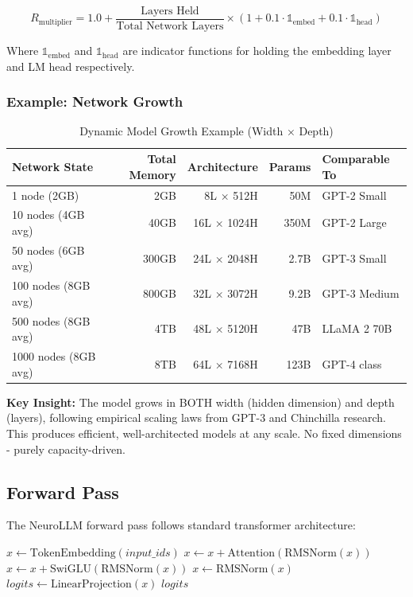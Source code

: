 \documentclass[11pt,a4paper]{article}
\begin{document}
\begin{equation}
R_{\text{multiplier}} = 1.0 + \frac{\text{Layers Held}}{\text{Total Network Layers}} \times (1 + 0.1 \cdot \mathbb{1}_{\text{embed}} + 0.1 \cdot \mathbb{1}_{\text{head}})
\end{equation}

Where $\mathbb{1}_{\text{embed}}$ and $\mathbb{1}_{\text{head}}$ are indicator functions for holding the embedding layer and LM head respectively.

\subsubsection{Example: Network Growth}

\begin{table}[H]
\centering
\caption{Dynamic Model Growth Example (Width × Depth)}
\label{tab:dynamic-growth}
\begin{tabular}{@{}lrrrl@{}}
\toprule
\textbf{Network State} & \textbf{Total Memory} & \textbf{Architecture} & \textbf{Params} & \textbf{Comparable To} \\
\midrule
1 node (2GB) & 2GB & 8L × 512H & 50M & GPT-2 Small \\
10 nodes (4GB avg) & 40GB & 16L × 1024H & 350M & GPT-2 Large \\
50 nodes (6GB avg) & 300GB & 24L × 2048H & 2.7B & GPT-3 Small \\
100 nodes (8GB avg) & 800GB & 32L × 3072H & 9.2B & GPT-3 Medium \\
500 nodes (8GB avg) & 4TB & 48L × 5120H & 47B & LLaMA 2 70B \\
1000 nodes (8GB avg) & 8TB & 64L × 7168H & 123B & GPT-4 class \\
\bottomrule
\end{tabular}
\end{table}

\textbf{Key Insight:} The model grows in BOTH width (hidden dimension) and depth (layers), following empirical scaling laws from GPT-3 and Chinchilla research. This produces efficient, well-architected models at any scale. No fixed dimensions - purely capacity-driven.

\subsection{Forward Pass}

The NeuroLLM forward pass follows standard transformer architecture:

\begin{algorithm}[H]
\caption{NeuroLLM Forward Pass}
\begin{algorithmic}[1]
    \State $x \gets \text{TokenEmbedding}(input\_ids)$
    \For{$layer \in [0, \text{num\_layers})$}
        \State $x \gets x + \text{Attention}(\text{RMSNorm}(x))$ 
        \State $x \gets x + \text{SwiGLU}(\text{RMSNorm}(x))$
    \EndFor
    \State $x \gets \text{RMSNorm}(x)$
    \State $logits \gets \text{LinearProjection}(x)$
    \State \Return $logits$
\EndProcedure
\end{algorithmic}
\end{algorithm}
\end{document}

